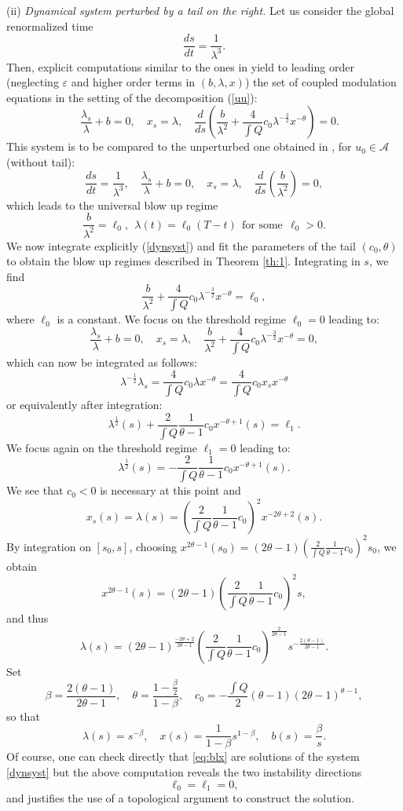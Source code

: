 \documentclass[11pt,a4paper,reqno]{amsart}
\theoremstyle{remark}
\numberwithin{equation}{section}
\newcommand{\be}{\begin{equation}}
\newcommand{\ee}{\end{equation}}
\def\fref#1{{\rm (\ref{#1})}}
\def\e{\varepsilon}
\def\fref#1{{\rm (\ref{#1})}}
\def\lsl{\frac{\lambda_s}{\lambda}}
\def\l{\lambda}
\def\lsl{\frac{\lambda_s}{\lambda}}
\begin{document}
\noindent (ii) \emph{Dynamical system perturbed by  a  tail on the right.} Let us consider the global renormalized time 
\be
\label{sharpintro}
 \frac {ds}{dt} = \frac 1 {\l^3}. \ee
Then, explicit computations similar to the ones in \cite{MMR1} yield to leading order (neglecting $\e$ and higher order terms in $(b,\l,x)$) the set of coupled modulation equations in the setting of the decomposition \fref{uu}:
  \be\label{dynsyst}
 \quad \lsl+b=0,\quad x_s = \l,\quad \frac d{ds} \left( \frac b{\l^2} + \frac 4 {\int Q} c_0   \l^{-\frac 32} x^{-\theta} \right)=0.
 \ee
 This system is to be compared to the unperturbed one obtained in \cite{MMR1}, for $u_0\in \mathcal{A}$ (without tail):
 \be\label{dynsystbis}
 \frac {ds}{dt} = \frac 1 {\l^3}, \quad 
 \lsl+b=0,\quad x_s = \l,\quad \frac d{ds}   \left(\frac b{\l^2}\right)  =0,\ee
which leads to the universal blow up regime $$\frac b{\l^2} = \ell_0, \ \ \l(t) = \ell_0 (T-t)\ \ \mbox{for some}\ \ \ell_0>0.$$ We now integrate explicitly \fref{dynsyst} and fit the parameters of the tail $(c_0,\theta)$ to obtain the blow up regimes described in Theorem \ref{th:1}. Integrating  in $s$, we find
$$
 \frac b{\l^2} + \frac 4 {\int Q} c_0   \l^{-\frac 32} x^{-\theta} =\ell_0,
$$
where $\ell_0$ is a constant. We focus on the threshold regime $\ell_0=0$ leading to:
 \be
 \lsl+b=0,\quad x_s = \l,\quad 
 \frac b{\l^2} + \frac 4 {\int Q} c_0   \l^{-\frac 32} x^{-\theta}=0,
 \ee
 which can now be integrated as follows:
 $$
 \l^{-\frac 12}\l_s = \frac 4 {\int Q} c_0   \l x^{-\theta}
 = \frac 4 {\int Q} c_0 x_s x^{-\theta}
 $$
 or equivalently after integration:
 $$
   \l^{\frac 12}(s) + \frac 2 {\int Q}   \frac {1}{\theta-1}c_0 x^{-\theta+1}(s) = \ell_1.
 $$
 We focus again on the threshold regime $\ell_1=0$ leading to:
 $$
   \l^{\frac 12}(s) = -\frac 2 {\int Q}   \frac {1}{\theta-1}c_0 x^{-\theta+1}(s).
 $$ 
We see that $c_0<0$ is necessary at this point and
$$
x_s(s) = \l(s) = \left(\frac 2 {\int Q}   \frac {1}{\theta-1}c_0\right)^2 x^{-2 \theta+2}(s).
$$
By integration on $[s_0,s]$, choosing $ x^{2\theta-1}(s_0)=(2\theta- 1)\left(\frac 2 {\int Q}   \frac {1}{\theta-1}c_0\right)^2 s_0$, we obtain 
$$
x^{2\theta-1}(s) =  (2\theta- 1)\left(\frac 2 {\int Q}   \frac {1}{\theta-1}c_0\right)^2 s,
$$
and thus
$$
\l(s) =  (2\theta- 1)^{\frac {-2\theta+2}{2\theta-1}} \left(\frac 2 {\int Q}   \frac {1}{\theta-1} c_0\right)^{\frac {2}{2 \theta-1}}  s^{- \frac {2(\theta-1)}{2\theta-1}}.
$$
Set
$$
\beta =   \frac { 2(\theta-1)} {2\theta-1},\quad
\theta = \frac {1-\frac \beta2}{1-\beta}, \quad c_0 =-\frac { \int Q}2(\theta-1) (2\theta-1)^{\theta-1} ,$$
so that 
\be\label{eq:blx}
\l(s) = s^{-\beta}, \quad 
x(s) = \frac 1{1-\beta} s^{1-\beta},\quad
b(s) =\frac {\beta}s.
\ee
Of course, one can check directly that \eqref{eq:blx} are solutions of the system \eqref{dynsyst}
but the above computation reveals the two instability directions
\be
\label{unstabomodesintro}
\ell_0=\ell_1= 0,
\ee
and justifies the use of a topological argument to construct the solution. 
 
\end{document}

